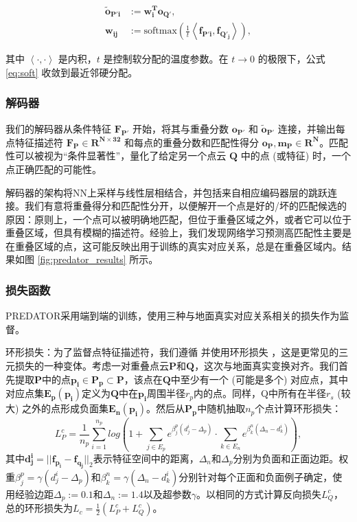 \begin{equation}
\begin{aligned}
    \label{eq:soft}
\boldsymbol{\tilde{o}_{P'i}} & := \boldsymbol{w_i^T o_{Q'}}, \\
\boldsymbol{w_{ij}} & := \text{softmax} \left( \frac{1}{t} \left<\boldsymbol{f_{P'i}}, \boldsymbol{f_{Q'_j}}\right> \right),
\end{aligned}
\end{equation}

其中 $\left<\cdot, \cdot\right>$ 是内积，$t$ 是控制软分配的温度参数。在 $t \rightarrow 0$ 的极限下，公式 \ref{eq:soft} 收敛到最近邻硬分配。

\subsubsection{解码器}
我们的解码器从条件特征 $\boldsymbol{F_{P'}}$ 开始，将其与重叠分数 $\boldsymbol{o_{P'}}$ 和 $\boldsymbol{\tilde{o}_{P'}}$ 连接，并输出每点特征描述符 $\boldsymbol{F_P \in R^{N \times 32}}$ 和每点的重叠分数和匹配性得分 $\boldsymbol{o_P, m_P \in R^N}$。匹配性可以被视为“条件显著性”，量化了给定另一个点云 $\boldsymbol{Q}$ 中的点 (或特征) 时，一个点正确匹配的可能性。

解码器的架构将NN上采样与线性层相结合，并包括来自相应编码器层的跳跃连接。我们有意将重叠得分和匹配性分开，以便解开一个点是好的/坏的匹配候选的原因：原则上，一个点可以被明确地匹配，但位于重叠区域之外，或者它可以位于重叠区域，但具有模糊的描述符。经验上，我们发现网络学习预测高匹配性主要是在重叠区域的点，这可能反映出用于训练的真实对应关系，总是在重叠区域内。结果如图 \ref{fig:predator_results} 所示。

\subsubsection{损失函数}
PREDATOR采用端到端的训练，使用三种与地面真实对应关系相关的损失作为监督。

环形损失：为了监督点特征描述符，我们遵循 \cite{bai2020d3feat} 并使用环形损失 \cite{sun2020circle} ，这是更常见的三元损失的一种变体。考虑一对重叠点云$\boldsymbol{P}$和$\boldsymbol{Q}$，这次与地面真实变换对齐。我们首先提取$\boldsymbol{P}$中的点$\boldsymbol{p_i} \in \boldsymbol{P_p} \subset \boldsymbol{P}$，该点在$\boldsymbol{Q}$中至少有一个 (可能是多个) 对应点，其中对应点集$\boldsymbol{E_p(p_i)}$定义为$\boldsymbol{Q}$中在$\boldsymbol{p_i}$周围半径$r_p$内的点。同样，Q中所有在半径$r_s$ (较大) 之外的点形成负面集$\boldsymbol{E_n(p_i)}$。然后从$\boldsymbol{P_p}$中随机抽取$n_p$个点计算环形损失：
\begin{equation}
L_P^c = \frac{1}{n_p} \sum_{i=1}^{n_p} log\left(1 + \sum_{j \in E_p} e^{\beta_j^p(d_j^i - \Delta_p)} \cdot \sum_{k \in E_n} e^{\beta_k^n(\Delta_n - d_k^i)}\right),
\end{equation}
其中$\boldsymbol{d_j^i} = ||\boldsymbol{f_{\boldsymbol{p_i}}} - \boldsymbol{f_{\boldsymbol{q_j}}}||_2$表示特征空间中的距离，$\Delta_n$和$\Delta_p$分别为负面和正面边距。权重$\beta_j^p = \gamma(d_j^i - \Delta_p)$和$\beta_k^n = \gamma(\Delta_n - d_k^i)$分别针对每个正面和负面例子确定，使用经验边距$\Delta_p := 0.1$和$\Delta_n := 1.4$以及超参数$\gamma$。以相同的方式计算反向损失$L_Q^c$，总的环形损失为$L_c = \frac{1}{2} (L_P^c + L_Q^c)$。

